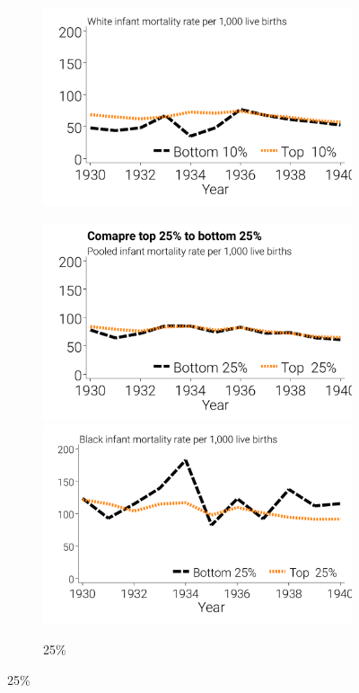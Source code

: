 \documentclass[12pt]{article}
\begin{document}
\begin{landscape}
\begin{figure}[!ht]
\begin{minipage}{\linewidth}
\begin{subfigure}[b]{0.33\columnwidth}
        \includegraphics[width=\linewidth]{../analysis/output/appendix/figure_m1a3_psm_top100pct_fake_treat_clean_cntrls_white_imr_by_treatment_over_time.pdf}
    \end{subfigure}
    \begin{subfigure}[b]{0.33\columnwidth}
        \centering
        \caption{25\%}
        \includegraphics[width=\linewidth]{../analysis/output/appendix/figure_m1b1_psm_top250pct_fake_treat_clean_cntrls_pooled_imr_by_treatment_over_time.pdf}
        \includegraphics[width=\linewidth]{../analysis/output/appendix/figure_m1b2_psm_top250pct_fake_treat_clean_cntrls_black_imr_by_treatment_over_time.pdf}

\end{subfigure}
\end{minipage}
\end{figure}
\end{landscape}
\end{document}
